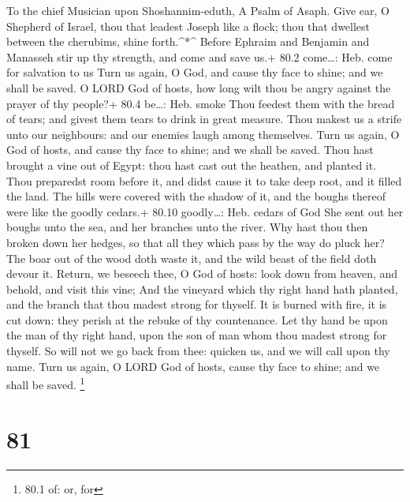 To the chief Musician upon Shoshannim-eduth, A Psalm of Asaph.
 Give ear, O Shepherd of Israel, thou that leadest Joseph
like a flock; thou that dwellest between the cherubims, shine
forth.\^{}*\^{}  Before Ephraim and Benjamin and Manasseh
stir up thy strength, and come and save us.+ 80.2 come\ldots: Heb. come
for salvation to us  Turn us again, O God, and cause thy
face to shine; and we shall be saved.  O LORD God of hosts,
how long wilt thou be angry against the prayer of thy people?+ 80.4
be\ldots: Heb. smoke  Thou feedest them with the bread of
tears; and givest them tears to drink in great measure. 
Thou makest us a strife unto our neighbours: and our enemies laugh among
themselves.  Turn us again, O God of hosts, and cause thy
face to shine; and we shall be saved.  Thou hast brought a
vine out of Egypt: thou hast cast out the heathen, and planted it.
 Thou preparedst room before it, and didst cause it to take
deep root, and it filled the land.  The hills were covered
with the shadow of it, and the boughs thereof were like the goodly
cedars.+ 80.10 goodly\ldots: Heb. cedars of God  She sent
out her boughs unto the sea, and her branches unto the river.
 Why hast thou then broken down her hedges, so that all
they which pass by the way do pluck her?  The boar out of
the wood doth waste it, and the wild beast of the field doth devour it.
 Return, we beseech thee, O God of hosts: look down from
heaven, and behold, and visit this vine;  And the vineyard
which thy right hand hath planted, and the branch that thou madest
strong for thyself.  It is burned with fire, it is cut
down: they perish at the rebuke of thy countenance.  Let
thy hand be upon the man of thy right hand, upon the son of man whom
thou madest strong for thyself.  So will not we go back
from thee: quicken us, and we will call upon thy name. 
Turn us again, O LORD God of hosts, cause thy face to shine; and we
shall be saved. \footnote{80.1 of: or, for}

\hypertarget{section-80}{%
\section{81}\label{section-80}}

